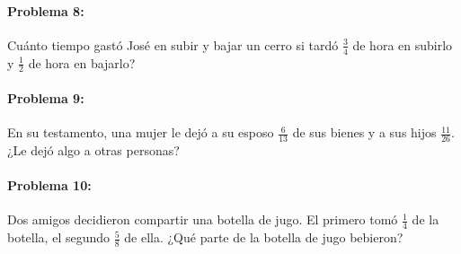 \documentclass[10pt,twoside]{article}
\begin{document}
\paragraph*{Problema 8:} Cuánto tiempo gastó José en subir y bajar un cerro si tardó $\frac{3}{4}$ de hora en subirlo y $\frac{1}{2}$ de hora en bajarlo?
\paragraph*{Problema 9:} En su testamento, una mujer le dejó a su esposo $\frac{6}{13}$ de sus bienes y a sus hijos $\frac{11}{26}$. ¿Le dejó algo a otras personas?
\paragraph*{Problema 10:} Dos amigos decidieron compartir una botella de jugo. El primero tomó $\frac{1}{4}$ de la botella, el segundo $\frac{5}{8}$ de ella. ¿Qué parte de la botella de jugo bebieron?
\end{document}
